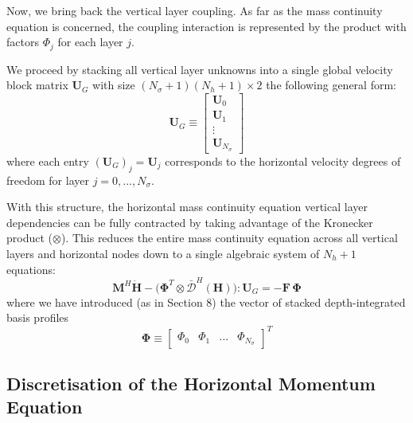 \documentclass{article}
\newcommand{\Ns}{N_\sigma}
\newcommand{\Nh}{N_h}
\newcommand{\HmM}{\mathbf{M}^H}
\newcommand{\HtDdwH}{\bar{\boldsymbol{\mathcal{D}}}^H(\Hvec)}
\newcommand{\Uj}{\mathbf{U}_j}
\newcommand{\Hvec}{\mathbf{H}}
\newcommand{\Ublock}{\mathbf{U}_G}
\begin{document}
Now, we bring back the vertical layer coupling. 
As far as the mass continuity equation is concerned, the coupling interaction is represented by the product with factors $\Phi_j$ for each layer $j$. 

We proceed by stacking all vertical layer unknowns into a single global velocity block matrix $\Ublock$ with size $(\Ns+1)(\Nh+1 )\times 2$ the following general form:
\begin{equation}
    \Ublock \equiv \begin{bmatrix}
    \mathbf{U}_0 \\[1mm]
    \mathbf{U}_1 \\[1mm]
    \vdots \\[1mm]
    \mathbf{U}_{\Ns}
    \end{bmatrix}
    \label{eq: def vertically stacked horizontal velocities}
\end{equation}
where each entry $(\Ublock)_j = \Uj$ corresponds to the horizontal velocity degrees of freedom for layer $j=0,...,\Ns$.  

With this structure, the horizontal mass continuity equation vertical layer dependencies can be fully contracted by taking advantage of the Kronecker product ($\otimes$).
This reduces the entire mass continuity equation across all vertical layers and horizontal nodes down to a single algebraic system of $\Nh+1$ equations:   
\begin{equation}
    \boxed{\HmM \dot{\Hvec} - \big(\boldsymbol{\Phi}^T \otimes \HtDdwH \big): \Ublock =  -\mathbf{F} \, \boldsymbol{\Phi}}
    \label{eq: fully compresses mass continuity equation}
\end{equation}
where we have introduced (as in Section 8) the vector of stacked depth-integrated basis profiles
\begin{equation}
    \boldsymbol{\Phi} \equiv \begin{bmatrix}
    \Phi_0 & \Phi_1 & \dots & \Phi_{\Ns}
    \end{bmatrix}^T
    \label{eq: def array Phi discrete}
\end{equation}




 
\subsection{Discretisation of the Horizontal Momentum Equation}
\end{document}
